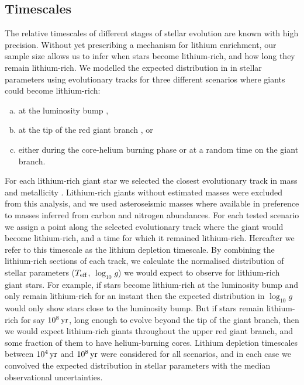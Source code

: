\documentclass[twocolumn]{aastex62}
\begin{document}
\subsection{Timescales}

The relative timescales of different stages of stellar evolution are known with
high precision. Without yet prescribing a mechanism for lithium 
enrichment, our sample size allows us to infer when stars become lithium-rich,
and how long they remain lithium-rich. We modelled the expected distribution 
in in stellar parameters using evolutionary tracks \citep{Dotter_2016,Choi_2016}
for three different scenarios where giants could become lithium-rich:
\begin{enumerate}[(a)]
	\item at the luminosity bump \citep[e.g.,][]{Charbonnel_2000},
	\item at the tip of the red giant branch \citep[e.g.,][]{Lattanzio_2014}, or
	\item either during the core-helium burning phase or at a random time on the giant branch.
\end{enumerate} 


For each lithium-rich giant star we selected the closest evolutionary track in 
mass and metallicity \citep{Dotter_2016,Choi_2016}. Lithium-rich giants without 
estimated masses were excluded from this analysis, and we used asteroseismic masses 
where available in preference to masses inferred from carbon and nitrogen abundances. 
For each tested scenario we assign a point along the selected evolutionary track 
where the giant would become lithium-rich, and a time for which it remained 
lithium-rich. Hereafter we refer to this timescale as the lithium depletion timescale. 
By combining the lithium-rich sections of each track, we calculate the normalised distribution 
of stellar parameters ($T_{\rm eff}$, $\log_{10}{g}$) we would expect to 
observe for lithium-rich giant stars. For example, if stars become lithium-rich 
at the luminosity bump and only remain lithium-rich for an instant then the expected
distribution in $\log_{10}{g}$ would only show stars close to the luminosity bump.
But if stars remain lithium-rich for say $10^8\,{\rm yr}$, long enough to evolve 
beyond the tip of the giant branch, then we would expect lithium-rich giants 
throughout the upper red giant branch, and some fraction of them to have
helium-burning cores.
Lithium depletion timescales between $10^4\,{\rm yr}$ and $10^8\,{\rm yr}$ were 
considered for all scenarios, and in each case we convolved the expected distribution in stellar 
parameters with the median observational uncertainties. 
\end{document}
